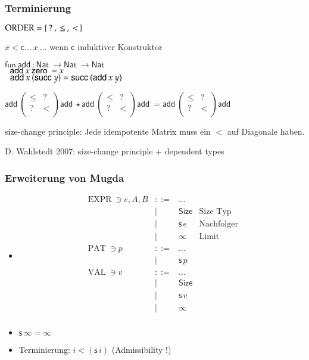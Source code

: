 \documentclass[12pt,red,serif,mathserif]{beamer}
\newcommand{\s}{\mathsf{s}\,}
\newcommand{\Size}{\mathsf{Size}}
\newcommand{\fun}{\mathsf{fun}\:}
\newcommand{\Nat}{\mathsf{Nat}\:}
\newcommand{\zero}{\mathsf{zero}\:}
\newcommand{\suc}{\mathsf{succ}\:}
\newcommand{\add}{\mathsf{add}\:}
\newenvironment{bsp}
{\begin{list}{}{
\setlength{\leftmargin}{0cm}
\setlength{\rightmargin}{0cm}
}\item}{
\end {list}
}
\newcommand{\ra}{\rightarrow}
\newcommand{\spc}{\hspace*{2mm}}
\newcommand{\cc}{\mathsf{c}}
\newcommand{\opn}[1]{\operatorname{#1}}
\newcommand{\Expr}{\opn{EXPR}}
\newcommand{\Val}{\opn{VAL}}
\newcommand{\Pat}{\opn{PAT}}
\begin{document}
\frame
{

\frametitle{Terminierung}

\begin{itemize}
\item
$\order = \{ \: ? \: , \: \leq \: , \: < \: \}$
\item
$ x < \cc \ldots \: x \: \ldots $ wenn $\cc$ induktiver Konstruktor
\vspace*{0.2cm}
\item
\begin{bsp}
$\fun \add : \Nat \ra \Nat \ra \Nat$\\
$\spc \add x \: \zero = x $\\
$\spc \add x \: (\suc y) = \suc (\add x \: y)  $
\end{bsp}
\vspace*{0.2cm}
\item
$
\add\begin{pmatrix}
\leq & ? \\
?    & < \\
\end{pmatrix}\add
\star
\add\begin{pmatrix}
\leq & ? \\
?    & < \\
\end{pmatrix}\add
=
\add\begin{pmatrix}
\leq & ? \\
?    & < \\
\end{pmatrix}\add
$
\vspace*{0.2cm}
\item
size-change principle: Jede idempotente Matrix muss ein $<$ auf Diagonale haben.
\item
D. Wahlstedt 2007: size-change principle + dependent types
\end{itemize}

}

\frame
{

\frametitle{ Erweiterung von Mugda }

\begin{itemize}
\item
\[
\begin{array}{lrll}
\Expr \ni e,A,B & ::= & \ldots & \\
& \mid & \Size & \mbox{Size Typ} \\
& \mid & \s e  & \mbox{Nachfolger}\\
& \mid & \infty & \mbox{Limit}\\
\Pat \ni p & ::= & \ldots & \\
& \mid & \s p & \\
\Val \ni v & ::= & \ldots & \\
& \mid & \Size & \\
& \mid & \s v & \\
& \mid & \infty & \\
\end{array}
\]
\item
$\s \infty = \infty$
\item
Terminierung: $i < (\s i)$ (Admissibility !)
\end{itemize}
}
\end{document}
